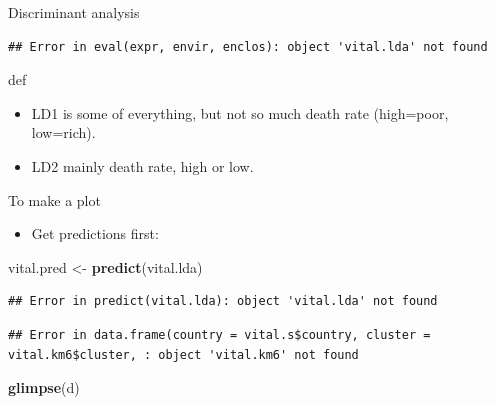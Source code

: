 \documentclass[ignorenonframetext,]{beamer}
\newenvironment{Shaded}{\begin{snugshade}}{\end{snugshade}}
\newcommand{\DataTypeTok}[1]{\textcolor[rgb]{0.13,0.29,0.53}{#1}}
\newcommand{\KeywordTok}[1]{\textcolor[rgb]{0.13,0.29,0.53}{\textbf{#1}}}
\newcommand{\NormalTok}[1]{#1}
\newcommand{\OperatorTok}[1]{\textcolor[rgb]{0.81,0.36,0.00}{\textbf{#1}}}
\newcommand{\StringTok}[1]{\textcolor[rgb]{0.31,0.60,0.02}{#1}}
\providecommand{\tightlist}{%
  \setlength{\itemsep}{0pt}\setlength{\parskip}{0pt}}
\begin{document}
\begin{frame}[fragile]{Discriminant analysis}
\begin{verbatim}
## Error in eval(expr, envir, enclos): object 'vital.lda' not found
\end{verbatim}

def

\begin{itemize}
\item
  LD1 is some of everything, but not so much death rate (high=poor,
  low=rich).
\item
  LD2 mainly death rate, high or low.
\end{itemize}

\end{frame}

\begin{frame}[fragile]{To make a plot}
\protect\hypertarget{to-make-a-plot}{}

\begin{itemize}
\tightlist
\item
  Get predictions first:
\end{itemize}

\begin{Shaded}
\begin{Highlighting}[]
\NormalTok{vital.pred <-}\StringTok{ }\KeywordTok{predict}\NormalTok{(vital.lda)}
\end{Highlighting}
\end{Shaded}

\begin{verbatim}
## Error in predict(vital.lda): object 'vital.lda' not found
\end{verbatim}

\begin{Shaded}
\end{Shaded}

\begin{verbatim}
## Error in data.frame(country = vital.s$country, cluster = vital.km6$cluster, : object 'vital.km6' not found
\end{verbatim}

\begin{Shaded}
\begin{Highlighting}[]
\KeywordTok{glimpse}\NormalTok{(d)}
\end{Highlighting}
\end{Shaded}


\end{frame}
\end{document}

